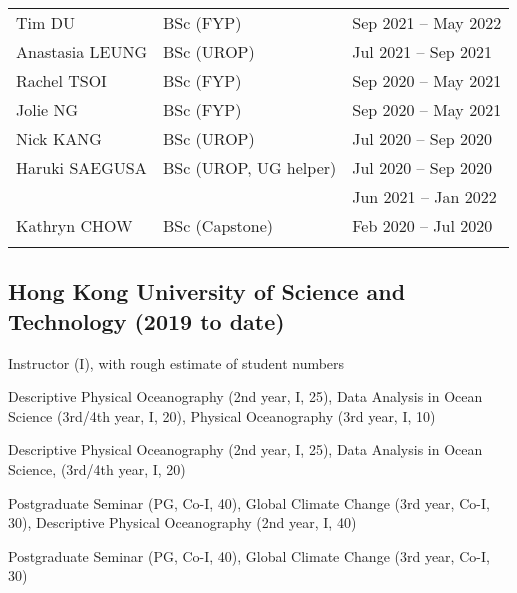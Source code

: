 \documentclass[letterpaper]{article}
\renewenvironment{itemize}{
  \begin{list}{}{
    \setlength{\leftmargin}{1.5em}
  }
}{
  \end{list}
}
\begin{document}
\begin{tabularx}{\textwidth}{XXX}
  Tim DU                  & BSc (FYP)             & Sep 2021 -- May 2022\\
  Anastasia LEUNG         & BSc (UROP)            & Jul 2021 -- Sep 2021\\
  Rachel TSOI             & BSc (FYP)             & Sep 2020 -- May 2021\\
  Jolie NG                & BSc (FYP)             & Sep 2020 -- May 2021\\
  Nick KANG               & BSc (UROP)            & Jul 2020 -- Sep 2020\\
  Haruki SAEGUSA          & BSc (UROP, UG helper) & Jul 2020 -- Sep 2020\\
                          &                       & Jun 2021 -- Jan 2022\\
  Kathryn CHOW            & BSc (Capstone)        & Feb 2020 -- Jul 2020\\
  \\
\end{tabularx}

\subsection*{Hong Kong University of Science and Technology (2019 to date)}
\begin{itemize}
\item Instructor (I), with rough estimate of
student numbers
\begin{itemize}
  \item[22/23:] Descriptive Physical Oceanography (2nd year, I, 25), Data
  Analysis in Ocean Science (3rd/4th year, I, 20), Physical Oceanography (3rd year, I, 10)
  \item[21/22:] Descriptive Physical Oceanography (2nd year, I, 25), Data
  Analysis in Ocean Science, (3rd/4th year, I, 20)
  \item[20/21:] Postgraduate Seminar (PG, Co-I, 40), Global Climate Change (3rd
  year, Co-I, 30), Descriptive Physical Oceanography (2nd year, I, 40)
  \item[19/20:] Postgraduate Seminar (PG, Co-I, 40), Global Climate Change (3rd
  year, Co-I, 30)
\end{itemize}
\end{itemize}

\end{document}
